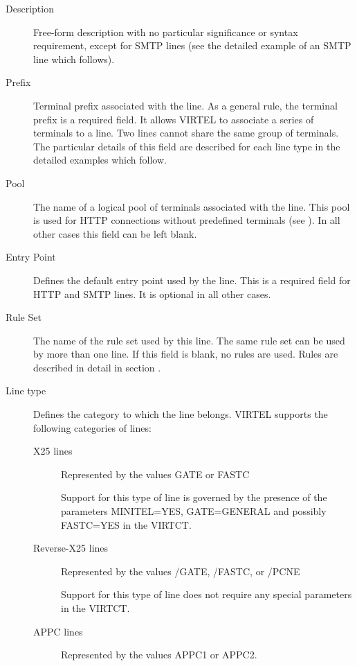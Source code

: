 \documentclass[letterpaper,10pt,english]{sphinxmanual}
\begin{document}
\begin{description}
\item[{Description}] \leavevmode
Free-form description with no particular significance or syntax requirement, except for SMTP lines (see the detailed example of an SMTP line which follows).

\item[{Prefix}] \leavevmode
Terminal prefix associated with the line. As a general rule, the terminal prefix is a required field. It allows VIRTEL to associate a series of terminals to a line. Two lines cannot share the same group of terminals. The particular details of this field are described for each line type in the detailed examples which follow.

\item[{Pool}] \leavevmode
The name of a logical pool of terminals associated with the line. This pool is used for HTTP connections without predefined terminals
(see {\hyperref[\detokenize{connectivity_guide:v461cn-forceluname}]{}}). In all other cases this field can be left blank.

\item[{Entry Point}] \leavevmode
Defines the default entry point used by the line. This is a required field for HTTP and SMTP lines. It is optional in all other cases.

\item[{Rule Set}] \leavevmode
The name of the rule set used by this line. The same rule set can be used by more than one line. If this field is blank, no rules are used. Rules are described in detail in section .

\item[{Line type}] \leavevmode
Defines the category to which the line belongs. VIRTEL supports the following categories of lines:
\begin{description}
\item[{X25 lines}] \leavevmode
Represented by the values GATE or FASTC

Support for this type of line is governed by the presence of the
parameters MINITEL=YES, GATE=GENERAL and possibly FASTC=YES in the
VIRTCT.

\item[{Reverse-X25 lines}] \leavevmode
Represented by the values /GATE, /FASTC, or /PCNE

Support for this type of line does not require any special
parameters in the VIRTCT.

\item[{APPC lines}] \leavevmode
Represented by the values APPC1 or APPC2.


\end{description}
\end{description}
\end{document}

